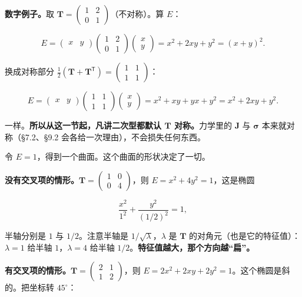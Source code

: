 \documentclass[11pt]{ctexart}
\newcommand{\ten}[1]{\mathbf{#1}}
\let\origsubhdr\subhdr
\renewcommand{\subhdr}[1]{\par\needspace{3\baselineskip}\origsubhdr{#1}}
\begin{document}
\textbf{数字例子。}取 $\ten T=\begin{pmatrix}1&2\\0&1\end{pmatrix}$（不对称）。算 $E$：

\[
E=\begin{pmatrix}x&y\end{pmatrix}\begin{pmatrix}1&2\\0&1\end{pmatrix}\begin{pmatrix}x\\y\end{pmatrix}
=x^2+2xy+y^2=(x+y)^2 .
\]

换成对称部分 $\tfrac12(\ten T+\ten T^{\mathsf T})=\begin{pmatrix}1&1\\1&1\end{pmatrix}$：

\[
E=\begin{pmatrix}x&y\end{pmatrix}\begin{pmatrix}1&1\\1&1\end{pmatrix}\begin{pmatrix}x\\y\end{pmatrix}=x^2+xy+yx+y^2=x^2+2xy+y^2 .
\]

一样。\textbf{所以从这一节起，凡讲二次型都默认 $\ten T$ 对称。}力学里的 $\ten J$ 与 $\ten\sigma$ 本来就对称（§7.2、§9.2 会各给一次理由），不会损失任何东西。


令 $E=1$，得到一个曲面。这个曲面的形状决定了一切。

\textbf{没有交叉项的情形。}$\ten T=\begin{pmatrix}1&0\\0&4\end{pmatrix}$，则 $E=x^2+4y^2=1$，这是椭圆

\[
\frac{x^2}{1^2}+\frac{y^2}{(1/2)^2}=1,
\]

半轴分别是 $1$ 与 $1/2$。注意半轴是 $1/\sqrt{\lambda}$，$\lambda$ 是 $\ten T$ 的对角元（也是它的特征值）：$\lambda=1$ 给半轴 $1$，$\lambda=4$ 给半轴 $1/2$。\textbf{特征值越大，那个方向越“扁”。}

\textbf{有交叉项的情形。}$\ten T=\begin{pmatrix}2&1\\1&2\end{pmatrix}$，则 $E=2x^2+2xy+2y^2=1$。这个椭圆是斜的。把坐标转 $45^\circ$：
\end{document}

